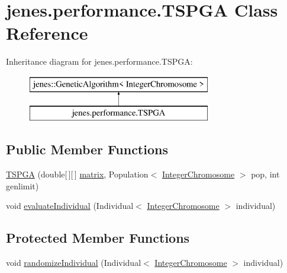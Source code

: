 \hypertarget{classjenes_1_1performance_1_1_t_s_p_g_a}{\section{jenes.\-performance.\-T\-S\-P\-G\-A Class Reference}
\label{classjenes_1_1performance_1_1_t_s_p_g_a}
}
Inheritance diagram for jenes.\-performance.\-T\-S\-P\-G\-A\-:\begin{figure}[H]
\begin{center}
\leavevmode
\includegraphics[height=2.000000cm]{classjenes_1_1performance_1_1_t_s_p_g_a}
\end{center}
\end{figure}
\subsection*{Public Member Functions}
\begin{DoxyCompactItemize}
\item 
\hyperlink{classjenes_1_1performance_1_1_t_s_p_g_a_a698ea31a106a7f42ffc65997bbee05fe}{T\-S\-P\-G\-A} (double\mbox{[}$\,$\mbox{]}\mbox{[}$\,$\mbox{]} \hyperlink{classjenes_1_1performance_1_1_t_s_p_g_a_a1e71f42efaa8c11e3028a4181e209b57}{matrix}, Population$<$ \hyperlink{classjenes_1_1chromosome_1_1_integer_chromosome}{Integer\-Chromosome} $>$ pop, int genlimit)
\item 
void \hyperlink{classjenes_1_1performance_1_1_t_s_p_g_a_a78282f6c98a63d8f438364a79d8239ab}{evaluate\-Individual} (Individual$<$ \hyperlink{classjenes_1_1chromosome_1_1_integer_chromosome}{Integer\-Chromosome} $>$ individual)
\end{DoxyCompactItemize}
\subsection*{Protected Member Functions}
\begin{DoxyCompactItemize}
\item 
void \hyperlink{classjenes_1_1performance_1_1_t_s_p_g_a_a469f2cfa3bf84b07af85546e610fd624}{randomize\-Individual} (Individual$<$ \hyperlink{classjenes_1_1chromosome_1_1_integer_chromosome}{Integer\-Chromosome} $>$ individual)
\end{DoxyCompactItemize}
